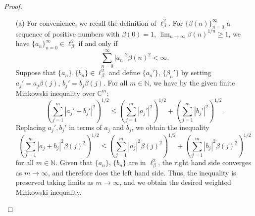 \documentclass[12pt]{article}
\theoremstyle{definition}
\begin{document}
	\begin{proof} ~
		\begin{itemize}
			\item[(a)] For convenience, we recall the definition of $\ell_\beta^2$. For $\{\beta(n)\}_{n = 0}^\infty$ a sequence of positive numbers with $\beta(0) = 1$, $\lim_{n \to \infty} \beta(n)^{1/n} \geq 1$, we have $\{a_n\}_{n = 0}^\infty \in \ell_\beta^2$ if and only if $$\sum_{n = 0}^\infty |a_n|^2 \beta(n)^2 < \infty.$$ 
			Suppose that $\{a_n\}, \{b_n\} \in \ell_\beta^2$ and define $\{a_n'\}$, $\{\beta_n'\}$ by setting $a_j' = a_j \beta(j)$, $b_j' = b_j \beta(j)$. For all $m \in \mathbb{N}$, we have by the given finite Minkowski inequality over $\mathbb{C}^m$: $$\left(\sum_{j = 1}^m |a_j' + b_j'|^2\right)^{1/2} \leq \left(\sum_{j = 1}^m |a_j'|^2\right)^{1/2} + \left(\sum_{j = 1}^m |b_j'|^2\right)^{1/2}.$$ Replacing $a_j', b_j'$ in terms of $a_j$ and $b_j$, we obtain the inequality $$\left(\sum_{j = 1}^m |a_j + b_j|^2\beta(j)^2\right)^{1/2} \leq \left(\sum_{j = 1}^m |a_j|^2 \beta(j)^2\right)^{1/2} + \left(\sum_{j = 1}^m |b_j|^2 \beta(j)^2\right)^{1/2}$$ for all $m \in \mathbb{N}$. Given that $\{a_n\}$, $\{b_n\}$ are in $\ell_\beta^2$, the right hand side converges as $m \to \infty$, and therefore does the left hand side. Thus, the inequality is preserved taking limits as $m \to \infty$, and we obtain the desired weighted Minkowski inequality.
			

\end{itemize}
\end{proof}
\end{document}
